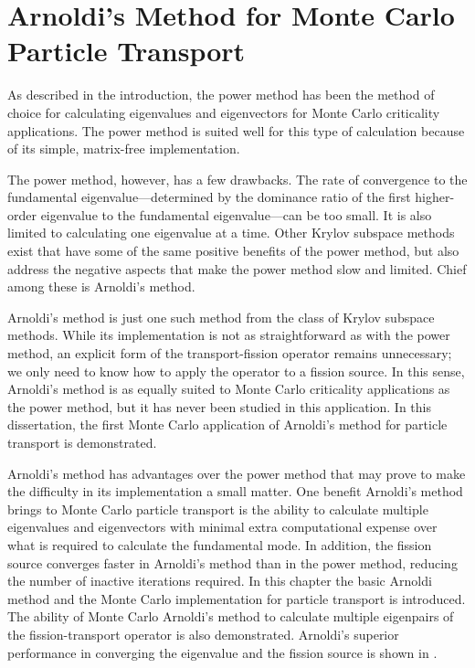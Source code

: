 \chapter{Arnoldi's Method for Monte Carlo Particle Transport \label{ch:ArnoldiMethod}}
As described in the introduction, the power method has been the method of choice for calculating eigenvalues and eigenvectors for Monte Carlo criticality applications.  The power method is suited well for this type of calculation because of its simple, matrix-free implementation.

The power method, however, has a few drawbacks.  The rate of convergence to the fundamental eigenvalue---determined by the dominance ratio of the first higher-order eigenvalue to the fundamental eigenvalue---can be too small.  It is also limited to calculating one eigenvalue at a time.  Other Krylov subspace methods exist that have some of the same positive benefits of the power method, but also address the negative aspects that make the power method slow and limited.  Chief among these is Arnoldi's method.

Arnoldi's method \cite{Arnoldi:1951The-P-0} is just one such method from the class of Krylov subspace methods.  While its implementation is not as straightforward as with the power method, an explicit form of the transport-fission operator remains unnecessary; we only need to know how to apply the operator to a fission source.  In this sense, Arnoldi's method is as equally suited to Monte Carlo criticality applications as the power method, but it has never been studied in this application.  In this dissertation, the first Monte Carlo application of Arnoldi's method for particle transport is demonstrated.

Arnoldi's method has advantages over the power method that may prove to make the difficulty in its implementation a small matter.  One benefit Arnoldi's method brings to Monte Carlo particle transport is the ability to calculate multiple eigenvalues and eigenvectors with minimal extra computational expense over what is required to calculate the fundamental mode.  In addition, the fission source converges faster in Arnoldi's method than in the power method, reducing the number of inactive iterations required.  In this chapter the basic Arnoldi method and the Monte Carlo implementation for particle transport is introduced.   The ability of Monte Carlo Arnoldi's method to calculate multiple eigenpairs of the fission-transport operator is also demonstrated.  Arnoldi's superior performance in converging the eigenvalue and the fission source is shown in .

